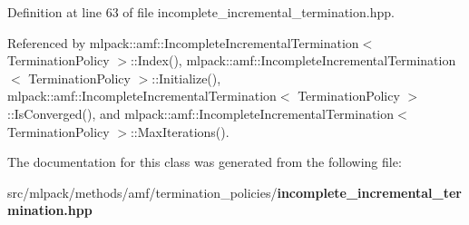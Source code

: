Definition at line 63 of file incomplete\-\_\-incremental\-\_\-termination.\-hpp.



Referenced by mlpack\-::amf\-::\-Incomplete\-Incremental\-Termination$<$ Termination\-Policy $>$\-::\-Index(), mlpack\-::amf\-::\-Incomplete\-Incremental\-Termination$<$ Termination\-Policy $>$\-::\-Initialize(), mlpack\-::amf\-::\-Incomplete\-Incremental\-Termination$<$ Termination\-Policy $>$\-::\-Is\-Converged(), and mlpack\-::amf\-::\-Incomplete\-Incremental\-Termination$<$ Termination\-Policy $>$\-::\-Max\-Iterations().



The documentation for this class was generated from the following file\-:\begin{DoxyCompactItemize}
\item 
src/mlpack/methods/amf/termination\-\_\-policies/{\bf incomplete\-\_\-incremental\-\_\-termination.\-hpp}\end{DoxyCompactItemize}
